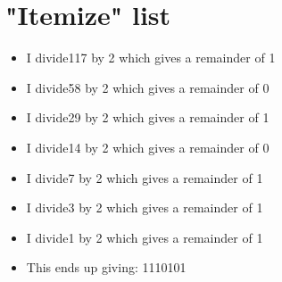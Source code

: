 \documentclass{article}%
\begin{document}
%
\normalsize%
\section{"Itemize" list}%
\label{sec:Itemizelist}%
\begin{itemize}%
\item%
I divide117 by 2 which gives a remainder of 1%
\item%
I divide58 by 2 which gives a remainder of 0%
\item%
I divide29 by 2 which gives a remainder of 1%
\item%
I divide14 by 2 which gives a remainder of 0%
\item%
I divide7 by 2 which gives a remainder of 1%
\item%
I divide3 by 2 which gives a remainder of 1%
\item%
I divide1 by 2 which gives a remainder of 1%
\item%
This ends up giving: 1110101%
\end{itemize}

%
\end{document}
